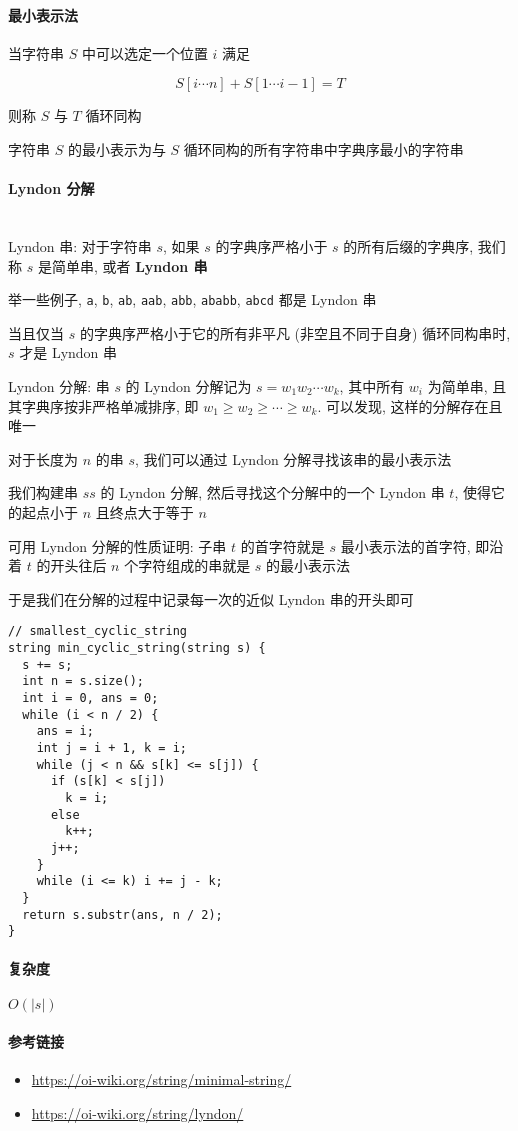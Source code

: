 \paragraph{最小表示法}

当字符串 \(S\) 中可以选定一个位置 \(i\) 满足

\[
    S[i\cdots n]+S[1\cdots i-1]=T
\]

则称 \(S\) 与 \(T\) 循环同构

字符串 \(S\) 的最小表示为与 \(S\) 循环同构的所有字符串中字典序最小的字符串

\paragraph{Lyndon 分解}~\\

Lyndon 串: 对于字符串 \(s\), 如果 \(s\) 的字典序严格小于 \(s\) 的所有后缀的字典序, 我们称 \(s\) 是简单串, 或者 \textbf{Lyndon 串}

举一些例子, \verb|a|, \verb|b|, \verb|ab|, \verb|aab|, \verb|abb|, \verb|ababb|, \verb|abcd| 都是 Lyndon 串

当且仅当 \(s\) 的字典序严格小于它的所有非平凡 (非空且不同于自身) 循环同构串时, \(s\) 才是 Lyndon 串

Lyndon 分解: 串 \(s\) 的 Lyndon 分解记为 \(s=w_1w_2\cdots w_k\), 其中所有 \(w_i\) 为简单串, 且其字典序按非严格单减排序, 即 \(w_1\ge w_2\ge\cdots\ge w_k\). 可以发现, 这样的分解存在且唯一

对于长度为 \(n\) 的串 \(s\), 我们可以通过 Lyndon 分解寻找该串的最小表示法

我们构建串 \(ss\) 的 Lyndon 分解, 然后寻找这个分解中的一个 Lyndon 串 \(t\), 使得它的起点小于 \(n\) 且终点大于等于 \(n\)

可用 Lyndon 分解的性质证明: 子串 \(t\) 的首字符就是 \(s\) 最小表示法的首字符, 即沿着 \(t\) 的开头往后 \(n\) 个字符组成的串就是 \(s\) 的最小表示法

于是我们在分解的过程中记录每一次的近似 Lyndon 串的开头即可

\begin{verbatim}
// smallest_cyclic_string
string min_cyclic_string(string s) {
  s += s;
  int n = s.size();
  int i = 0, ans = 0;
  while (i < n / 2) {
    ans = i;
    int j = i + 1, k = i;
    while (j < n && s[k] <= s[j]) {
      if (s[k] < s[j])
        k = i;
      else
        k++;
      j++;
    }
    while (i <= k) i += j - k;
  }
  return s.substr(ans, n / 2);
}
\end{verbatim}

\paragraph{复杂度}

\(O(|s|)\)

\paragraph{参考链接}

\begin{itemize}
    \item \url{https://oi-wiki.org/string/minimal-string/}
    \item \url{https://oi-wiki.org/string/lyndon/}
\end{itemize}
